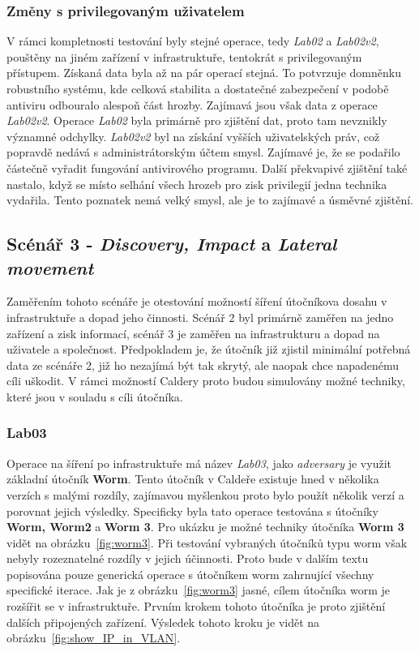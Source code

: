 \subsubsection{Změny s privilegovaným uživatelem}
V rámci kompletnosti testování byly stejné operace, tedy \textit{Lab02} a \textit{Lab02v2}, pouštěny na jiném zařízení v infrastruktuře, tentokrát s privilegovaným přístupem.
Získaná data byla až na pár operací stejná.
To potvrzuje domněnku robustního systému, kde celková stabilita a dostatečné zabezpečení v podobě antiviru odbouralo alespoň část hrozby.
Zajímavá jsou však data z operace \textit{Lab02v2}.
Operace \textit{Lab02} byla primárně pro zjištění dat, proto tam nevznikly významné odchylky.
\textit{Lab02v2} byl na získání vyšších uživatelských práv, což popravdě nedává s administrátorským účtem smysl.
Zajímavé je, že se podařilo částečně vyřadit fungování antivirového programu.
Další překvapivé zjištění také nastalo, když se místo selhání všech hrozeb pro zisk privilegií jedna technika vydařila.
Tento poznatek nemá velký smysl, ale je to zajímavé a úsměvné zjištění.


\subsection{Scénář 3 - \textit{Discovery, Impact} a \textit{Lateral movement}}
Zaměřením tohoto scénáře je otestování možností šíření útočníkova dosahu v infrastruktuře a dopad jeho činnosti.
Scénář 2 byl primárně zaměřen na jedno zařízení a zisk informací, scénář 3 je zaměřen na infrastrukturu a dopad na uživatele a společnost.
Předpokladem je, že útočník již zjistil minimální potřebná data ze scénáře 2, již ho nezajímá být tak skrytý, ale naopak chce napadenému cíli uškodit.
V rámci možností Caldery proto budou simulovány možné techniky, které jsou v souladu s cíli útočníka.

\subsubsection{Lab03}
Operace na šíření po infrastruktuře má název \textit{Lab03}, jako \textit{adversary} je využit základní útočník \textbf{Worm}.
Tento útočník v Caldeře existuje hned v několika verzích s malými rozdíly, zajímavou myšlenkou proto bylo použít několik verzí a porovnat jejich výsledky.
Specificky byla tato operace testována s útočníky \textbf{Worm, Worm2} a \textbf{Worm 3}.
Pro ukázku je možné techniky útočníka \textbf{Worm 3} vidět na obrázku~\ref{fig:worm3}.
Při testování vybraných útočníků typu worm však nebyly rozeznatelné rozdíly v jejich účinnosti.
Proto bude v dalším textu popisována pouze generická operace s útočníkem worm zahrnující všechny specifické iterace.
Jak je z obrázku~\ref{fig:worm3} jasné, cílem útočníka worm je rozšířit se v infrastruktuře.
Prvním krokem tohoto útočníka je proto zjištění dalších připojených zařízení.
Výsledek tohoto kroku je vidět na obrázku~\ref{fig:show_IP_in_VLAN}.

